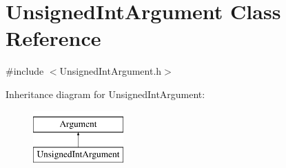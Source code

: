 \hypertarget{classUnsignedIntArgument}{\section{Unsigned\-Int\-Argument Class Reference}
\label{classUnsignedIntArgument}
}


{\ttfamily \#include $<$Unsigned\-Int\-Argument.\-h$>$}

Inheritance diagram for Unsigned\-Int\-Argument\-:\begin{figure}[H]
\begin{center}
\leavevmode
\includegraphics[height=2.000000cm]{classUnsignedIntArgument}
\end{center}
\end{figure}
